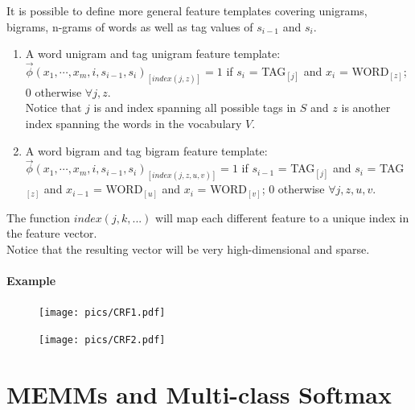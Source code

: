 It is possible to define more general feature templates covering unigrams, bigrams, n-grams of words as well as tag values of $s_{i-1}$ and $s_i$.

\begin{enumerate}
  
 \item A word unigram and tag unigram feature template: $\vec{\phi}(x_1, \cdots, x_m, i, s_{i-1},s_i)_{[index(j,z)]}=1$ if $s_i$ = TAG$_{[j]}$ and $x_i$ = WORD$_{[z]}$; 0 otherwise $\forall j,z$. \\ Notice that $j$ is and index spanning all possible tags in $S$ and $z$ is another index spanning the words in the vocabulary $V$.
 
 \item A word bigram and tag bigram feature template: $\vec{\phi}(x_1, \cdots, x_m, i, s_{i-1},s_i)_{[index(j,z,u,v)]}=1$ if $s_{i-1}$ = TAG$_{[j]}$ and $s_i$ = TAG$_{[z]}$ and $x_{i-1}$ = WORD$_{[u]}$ and $x_{i}$ = WORD$_{[v]}$; 0 otherwise $\forall j,z,u,v$. 
 
 
\end{enumerate}

The function $index(j,k,...)$ will map each different feature to a unique index in the feature vector.  \\
Notice that the resulting vector will be very high-dimensional and sparse.

\paragraph{Example}
  \begin{figure}[h]
        	\texttt{[image: pics/CRF1.pdf]}
        \end{figure}

  \begin{figure}[h]
        	\texttt{[image: pics/CRF2.pdf]}
        \end{figure}





\section{MEMMs and Multi-class Softmax}

